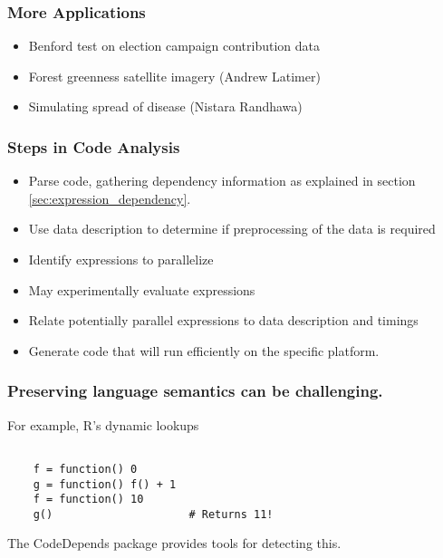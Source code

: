 \documentclass{beamer}
\begin{document}
\begin{frame}

    \frametitle{More Applications}


\begin{itemize}
    \item Benford test on election campaign contribution data
    \item Forest greenness satellite imagery (Andrew Latimer)
    \item Simulating spread of disease (Nistara Randhawa)
\end{itemize}

\end{frame}
\begin{frame}

    \frametitle{Steps in Code Analysis}

\begin{itemize}
    \item Parse code, gathering dependency information as explained in
        section \ref{sec:expression_dependency}.
    \item Use data description to determine if preprocessing of the data is
        required
    \item Identify expressions to parallelize
    \item May experimentally evaluate expressions 
    \item Relate potentially parallel expressions to data description and timings
    \item Generate code that will run efficiently on the specific platform.
\end{itemize}

\end{frame}
\begin{frame}[fragile]

   \frametitle{Preserving language semantics can be challenging.}

    For example, R's dynamic lookups 

\begin{verbatim}

    f = function() 0
    g = function() f() + 1
    f = function() 10
    g()                     # Returns 11!

\end{verbatim}

The CodeDepends package provides tools for detecting this.

\end{frame}
\end{document}
